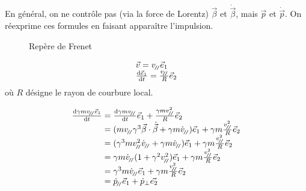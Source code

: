 \begin{remark}
En général, on ne contrôle pas (via la force de Lorentz) $\vec{\beta}$ et $\dot{\vec{\beta}}$, mais $\vec{p}$ et $\dot{\vec{p}}$. On réexprime ces formules en faisant apparaître l'impulsion. 


\begin{minipage}{0.5\linewidth}
\begin{figure}[H]
\centering
{}
\caption*{Repère de Frenet}
\end{figure}
\end{minipage}
\begin{minipage}{0.45\linewidth}
$$
	\begin{array}{l}
		\vec{v}=v_{\mbox{\textbf{\tiny \!/\!/}}}\vec{e}_1\\
		\frac{\mathrm{d}\vec{e}_1}{\mathrm{d} t}=\frac{v_{\mbox{\textbf{\tiny \!/\!/}}}}{R}\vec{e}_2
	\end{array}
$$
où $R$ désigne le rayon de courbure local.
\end{minipage}

\hspace{0.5cm}
$$
	\begin{array}{r@{\;}l}
		\frac{\dif\gamma mv_{\para}\vec{e}_1}{\dif t}&=
			\frac{\dif\gamma mv_{\para}}{\dif t}\vec{e}_1+\frac{\gamma mv_{\para}^2}{R}\vec{e}_2\\
			&=(mv_{\para}\gamma^3\vec{\beta}\cdot\dot{\vec{\beta}}+\gamma m\dot{v}_{\para})\vec{e}_1
				+\gamma m\frac{v_{\para}^2}{R}\vec{e}_2\\
			&=(\gamma^3mv_{\para}^2\dot{v}_{\para}+\gamma m\dot{v}_{\para})\vec{e}_1
				+\gamma m \frac{v_{\para}^2}{R}\vec{e}_2\\
			&=\gamma m\dot{v}_{\para}(1+\gamma^2v_{\para}^2)\vec{e}_1
				+\gamma m \frac{v_{\para}^2}{R}\vec{e}_2\\
			&=\gamma^3m\dot{v}_{\para}\vec{e}_1+\gamma m \frac{v_{\para}^2}{R}\vec{e}_2\\
			&=\dot{p}_{\para}\vec{e}_1+\dot{p}_{\perp}\vec{e_2}
	\end{array}
$$


\end{remark}
